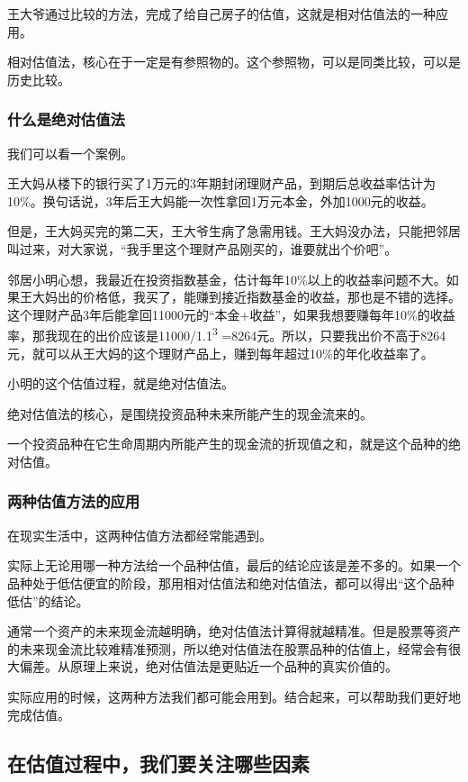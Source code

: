 王大爷通过比较的方法，完成了给自己房子的估值，这就是相对估值法的一种应用。

相对估值法，核心在于一定是有参照物的。这个参照物，可以是同类比较，可以是历史比较。

\subsubsection{什么是绝对估值法}

我们可以看一个案例。

王大妈从楼下的银行买了1万元的3年期封闭理财产品，到期后总收益率估计为10\%。换句话说，3年后王大妈能一次性拿回1万元本金，外加1000元的收益。

但是，王大妈买完的第二天，王大爷生病了急需用钱。王大妈没办法，只能把邻居叫过来，对大家说，“我手里这个理财产品刚买的，谁要就出个价吧”。

邻居小明心想，我最近在投资指数基金，估计每年10\%以上的收益率问题不大。如果王大妈出的价格低，我买了，能赚到接近指数基金的收益，那也是不错的选择。这个理财产品3年后能拿回11000元的“本金+收益”，如果我想要赚每年10\%的收益率，那我现在的出价应该是11000/1.1\textsuperscript{3} =8264元。所以，只要我出价不高于8264元，就可以从王大妈的这个理财产品上，赚到每年超过10\%的年化收益率了。

小明的这个估值过程，就是绝对估值法。

绝对估值法的核心，是围绕投资品种未来所能产生的现金流来的。

一个投资品种在它生命周期内所能产生的现金流的折现值之和，就是这个品种的绝对估值。

\subsubsection{两种估值方法的应用}

在现实生活中，这两种估值方法都经常能遇到。

实际上无论用哪一种方法给一个品种估值，最后的结论应该是差不多的。如果一个品种处于低估便宜的阶段，那用相对估值法和绝对估值法，都可以得出“这个品种低估”的结论。

通常一个资产的未来现金流越明确，绝对估值法计算得就越精准。但是股票等资产的未来现金流比较难精准预测，所以绝对估值法在股票品种的估值上，经常会有很大偏差。从原理上来说，绝对估值法是更贴近一个品种的真实价值的。

实际应用的时候，这两种方法我们都可能会用到。结合起来，可以帮助我们更好地完成估值。

\subsection{在估值过程中，我们要关注哪些因素}
